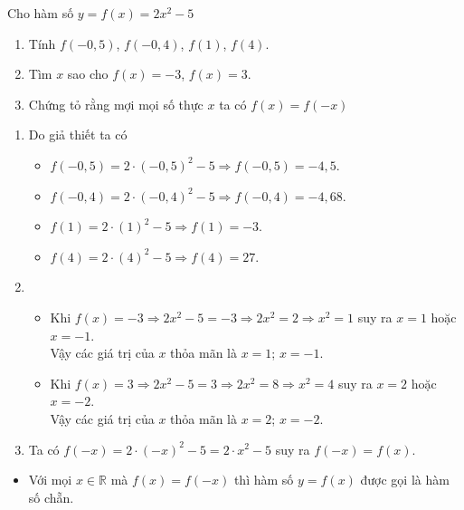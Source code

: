 \begin{bt}%
Cho hàm số $y = f\left(x\right) = 2x^2 - 5$
	\begin{enumerate}
		\item Tính $f\left(- 0{,}5\right)$, $f\left(- 0{,}4\right)$, $f\left(1\right)$, $f\left(4\right)$.
		\item Tìm $x$ sao cho $f\left(x\right) = - 3$, $f\left(x\right) = 3$. 
		\item Chứng tỏ rằng mợi mọi số thực $x$ ta có $f\left(x\right) = f \left(- x\right)$  
	\end{enumerate}
	\loigiai
	{\begin{enumerate}
			\item  Do giả thiết ta có
		\begin{itemize}
			\item  $f\left(-0{,}5\right) = 2\cdot\left(-0{,}5\right)^2 - 5 \Rightarrow f\left(-0{,}5\right)  = - 4{,}5$.
			\item  $f\left(-0{,}4\right) = 2\cdot\left(-0{,}4\right)^2 - 5 \Rightarrow f\left(-0{,}4\right)  = - 4{,}68$.
			\item  $f\left(1\right) = 2\cdot\left(1\right)^2 - 5 \Rightarrow f\left(1\right)  = - 3$.	
			\item  $f\left(4\right) = 2\cdot\left(4\right)^2 - 5 \Rightarrow f\left(4\right)  = 27$.	
		\end{itemize}
	\item  
	\begin{itemize}
		\item  Khi $f\left(x\right) = - 3\Rightarrow 2x^2  - 5 = - 3\Rightarrow 2x^2 = 2\Rightarrow x^2 = 1$ suy ra $x = 1$ hoặc $x = - 1$.\\
		Vậy các giá trị của $x$ thỏa mãn là $x = 1$; $x = - 1$.
		\item   Khi $f\left(x\right) = 3\Rightarrow 2x^2  - 5 =  3\Rightarrow 2x^2 = 8\Rightarrow x^2 = 4$ suy ra $x = 2$ hoặc $x = - 2$.\\
		Vậy các giá trị của $x$ thỏa mãn là $x = 2$; $x = -2$.
	\end{itemize}
\item  Ta có $f\left(- x\right) = 2\cdot \left(- x\right)^2 - 5 = 2\cdot x^2 - 5$ suy ra $f\left(- x\right) = f\left(x\right)$.
	\end{enumerate}
	}
\end{bt}
\begin{note}
	\begin{itemize}
		\item Với mọi $x\in\mathbb{R}$ mà $f\left(x\right) = f\left(- x\right)$ thì hàm số $y = f\left(x\right)$ được gọi là hàm số chẵn.
	\end{itemize}
\end{note}

